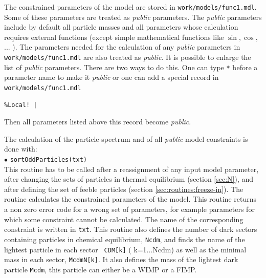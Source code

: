 \documentclass[12pt,a4paper]{article}
\begin{document}
The constrained parameters of the model are stored in \verb|work/models/func1.mdl|. Some of
these parameters are treated as {\it public} parameters. The {\it public} parameters include 
by default all particle masses 
and all parameters  whose calculation requires external functions (except simple
mathematical functions like $\sin,\cos$, ... ). The parameters needed for the calculation of any 
{\it public} parameters in  \verb|work/models/func1.mdl|
are also treated as {\it public}. 
It is possible to enlarge the list of {\it public} parameters. There are two ways to do this. 
One can type \verb|*| before a parameter name to make it {\it public} or one 
can add a  special record in \verb|work/models/func1.mdl|
\begin{verbatim}
%Local! |   
\end{verbatim}
Then all parameters listed above this record  become {\it public}. 


The calculation of the particle spectrum and of all  {\it public} model constraints 
is  done with:\\[2mm]
 $\bullet$ \verb|sortOddParticles(txt)|\\
This routine has to be called after a reassignment of any input model parameter,
after changing the  sets of particles in  thermal equilibrium (section \ref{sec:N}), and after defining the set of
feeble particles (section \ref{sec:routines:freeze-in}). The routine calculates the
constrained parameters of the model. This routine returns a non zero error code for a
wrong set of parameters, for example parameters  for which some
constraint cannot be calculated. The name of the corresponding constraint is
written in \verb|txt|. 
This routine also  defines the number of dark  sectors containing particles in chemical equilibrium, 
{\tt Ncdm},  and finds the  name  of the lightest particle in each sector {\tt
CDM[k]} ( k=1...Ncdm) as well as  the minimal mass  in each sector, {\tt McdmN[k]}. It also defines  the
 mass of the lightest dark particle {\tt Mcdm}, this particle can either be a WIMP or a FIMP.  
  
\end{document}
